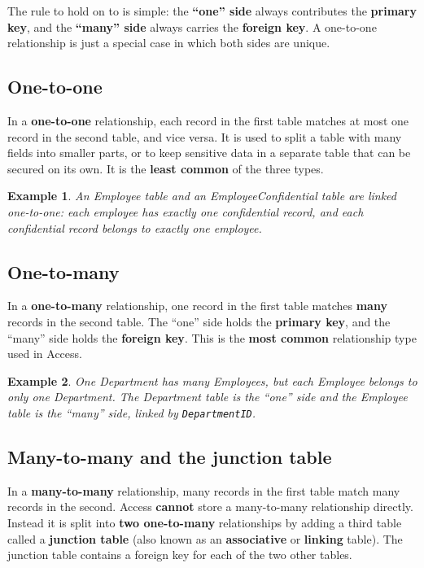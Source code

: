 \documentclass[11pt]{article}
\newtheorem{example}{Example}[section]
\begin{document}
The rule to hold on to is simple: the \textbf{``one'' side} always contributes
the \textbf{primary key}, and the \textbf{``many'' side} always carries the
\textbf{foreign key}. A one-to-one relationship is just a special case in
which both sides are unique.

\subsection{One-to-one}
In a \textbf{one-to-one} relationship, each record in the first table matches
at most one record in the second table, and vice versa. It is used to split a
table with many fields into smaller parts, or to keep sensitive data in a
separate table that can be secured on its own. It is the \textbf{least common}
of the three types.

\begin{example}
An Employee table and an EmployeeConfidential table are linked one-to-one:
each employee has exactly one confidential record, and each confidential
record belongs to exactly one employee.
\end{example}

\subsection{One-to-many}
In a \textbf{one-to-many} relationship, one record in the first table matches
\textbf{many} records in the second table. The ``one'' side holds the
\textbf{primary key}, and the ``many'' side holds the \textbf{foreign key}.
This is the \textbf{most common} relationship type used in Access.

\begin{example}
One Department has many Employees, but each Employee belongs to only one
Department. The Department table is the ``one'' side and the Employee table is
the ``many'' side, linked by \texttt{DepartmentID}.
\end{example}

\subsection{Many-to-many and the junction table}
In a \textbf{many-to-many} relationship, many records in the first table match
many records in the second. Access \textbf{cannot} store a many-to-many
relationship directly. Instead it is split into \textbf{two one-to-many}
relationships by adding a third table called a \textbf{junction table} (also
known as an \textbf{associative} or \textbf{linking} table). The junction
table contains a foreign key for each of the two other tables.
\end{document}
